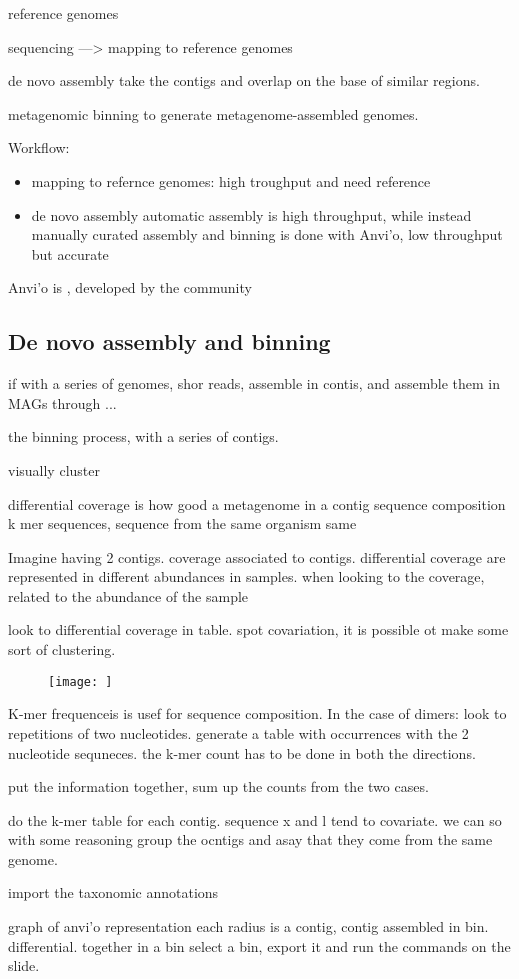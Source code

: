 reference genomes 


sequencing ---> mapping to reference genomes

de novo assembly take the contigs and overlap on the base of similar regions. 

metagenomic binning to generate metagenome-assembled genomes. 


Workflow:
\begin{itemize}
	\item mapping to refernce genomes: high troughput and need reference
	\item de novo assembly automatic assembly is high throughput, while instead manually curated assembly and binning is done with Anvi'o, low throughput but accurate
\end{itemize}


Anvi'o is , developed by the community


\subsection{De novo assembly and binning}
if with a series of genomes, shor reads, assemble in contis, and assemble them in MAGs through ...


the binning process, with a series of contigs. 

visually cluster

differential coverage is how good a metagenome in a contig
sequence composition k mer sequences, sequence from the same organism same

Imagine having 2 contigs. coverage associated to contigs. differential coverage are represented in different abundances in samples. 
when looking to the coverage, related to the abundance of the sample


look to differential coverage in table. spot covariation, it is possible ot make some sort of clustering.

\begin{figure}[h]
\caption{}
\centering
\texttt{[image: ]}
\label{}
\end{figure}


K-mer frequenceis is usef for sequence composition. 
In the case of dimers: look to repetitions of two nucleotides. generate a table with occurrences with the 2 nucleotide sequneces. the k-mer count has to be done in both the directions. 

put the information together, sum up the counts from the two cases. 

do the k-mer table for each contig. sequence x and l tend to covariate. we can so with some reasoning group the ocntigs and asay that they come from the same genome.

import the taxonomic annotations


graph of anvi'o
representation 
each radius  is a contig, contig assembled in bin.
differential. together in a bin
select a bin, export it and run the commands on the slide.  
